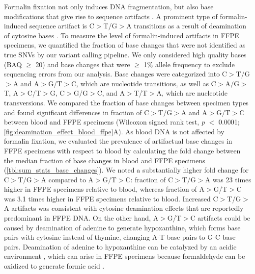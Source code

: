 Formalin fixation not only induces DNA fragmentation, but also base modifications that give rise to sequence artifacts \cite{Do2012, Do2013, Do2015a, Kim2017, Hofreiter2001, Wong2014, Ofner2017, Oh2015}. A prominent type of formalin-induced sequence artifact is C$>$T/G$>$A transitions as a result of deamination of cytosine bases \cite{Do2015a, Kim2017, Wong2014, Oh2015, Lin2014}. To measure the level of formalin-induced artifacts in FFPE specimens, we quantified the fraction of base changes that were not identified as true SNVs by our variant calling pipeline. We only considered high quality bases (BAQ $\geq$ 20) and base changes that were $\geq$ 1\% allele frequency to exclude sequencing errors from our analysis. Base changes were categorized into C$>$T/G$>$A and A$>$G/T$>$C, which are nucleotide transitions, as well as C$>$A/G$>$T, A$>$C/T$>$G, C$>$G/G$>$C, and A$>$T/T$>$A, which are nucleotide transversions. We compared the fraction of base changes between specimen types and found significant differences in fraction of C$>$T/G$>$A and A$>$G/T$>$C between blood and FFPE specimens (Wilcoxon signed rank test, \textit{p} $<$ 0.0001; \autoref{fig:deamination_effect_blood_ffpe}A). As blood DNA is not affected by formalin fixation, we evaluated the prevalence of artifactual base changes in FFPE specimens with respect to blood by calculating the fold change between the median fraction of base changes in blood and FFPE specimens (\autoref{tbl:sum_stats_base_changes}). We noted a substantially higher fold change for C$>$T/G$>$A compared to A$>$G/T$>$C: fraction of C$>$T/G$>$A was 23 times higher in FFPE specimens relative to blood, whereas fraction of A$>$G/T$>$C was 3.1 times higher in FFPE specimens relative to blood. Increased C$>$T/G$>$A artifacts was consistent with cytosine deamination effects that are reportedly predominant in FFPE DNA. On the other hand, A$>$G/T$>$C artifacts could be caused by deamination of adenine to generate hypoxanthine, which forms base pairs with cytosine instead of thymine, changing A-T base pairs to G-C base pairs. Deamination of adenine to hypoxanthine can be catalyzed by an acidic environment \cite{Wang2010}, which can arise in FFPE specimens because formaldehyde can be oxidized to generate formic acid \cite{Do2015a}.

